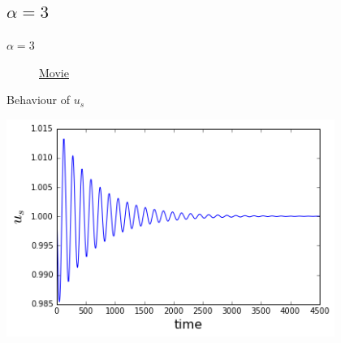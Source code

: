 \documentclass{beamer}
\begin{document}
\subsection{$\alpha = 3$}
\begin{frame}{$\alpha = 3$}
	\begin{figure}[h!]
		\href{https://www.youtube.com/watch?v=E4f0I4teyIc}{Movie}
	\end{figure} 
\end{frame}
\begin{frame}{Behaviour of $u_s$}
	\begin{center}
		\includegraphics[height=200pt]{3b}\\
		
	\end{center}	
\end{frame}
\end{document}
